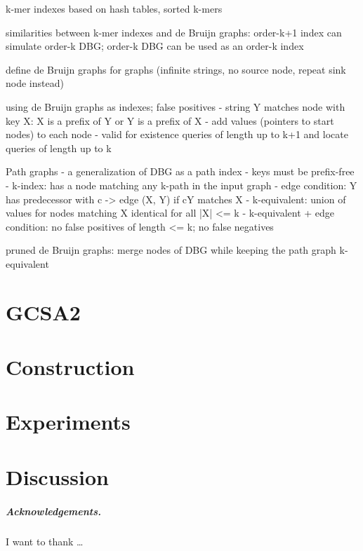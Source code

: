 \documentclass[a4paper,UKenglish]{lipics-v2016}
\begin{document}
k-mer indexes based on hash tables, sorted k-mers

similarities between k-mer indexes and de Bruijn graphs: order-k+1 index can simulate order-k DBG; order-k DBG can be used as an order-k index

define de Bruijn graphs for graphs (infinite strings, no source node, repeat sink node instead)

using de Bruijn graphs as indexes; false positives
- string Y matches node with key X: X is a prefix of Y or Y is a prefix of X
- add values (pointers to start nodes) to each node
- valid for existence queries of length up to k+1 and locate queries of length up to k

Path graphs
- a generalization of DBG as a path index
- keys must be prefix-free
- k-index: has a node matching any k-path in the input graph
- edge condition: Y has predecessor with c -> edge (X, Y) if cY matches X
- k-equivalent: union of values for nodes matching X identical for all |X| <= k
- k-equivalent + edge condition: no false positives of length <= k; no false negatives

pruned de Bruijn graphs: merge nodes of DBG while keeping the path graph k-equivalent


\section{GCSA2}


\section{Construction}


\section{Experiments}


\section{Discussion}


\subparagraph*{Acknowledgements.}

I want to thank \dots



\end{document}

